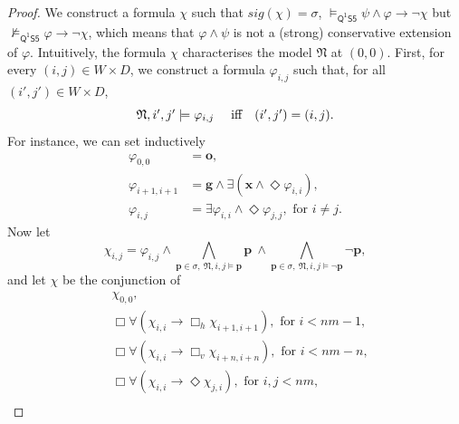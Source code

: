 \documentclass{lmcs} %
\theoremstyle{plain}\newtheorem{satz}[thm]{Satz} %
\newcommand{\sig}{\mathit{sig}}
\newcommand{\Bht}[1]{\Box_h{#1}}
\newcommand{\Bvt}[1]{\Box_v{#1}}
\newcommand{\FOMS}{\ensuremath{\mathsf{Q^1S5}}}
\newcommand{\fform}[1]{\boldsymbol{#1}}
\newcommand{\pvar}{\fform{p}}
\newcommand{\gvar}{\fform{g}}
\newcommand{\xvar}{\fform{x}}
\newcommand{\ovar}{\fform{o}}
\newcommand{\Bv}{\forall}
\newcommand{\Bh}{\Box}
\newcommand{\Dv}{\exists}
\newcommand{\Dh}{\Diamond}
\begin{document}
\begin{proof}
	
	
	We construct a formula $\chi$ such that $\sig(\chi) =\sigma$, $\models_\FOMS \psi\land \varphi \to \neg\chi$ but 
	$\not\models_\FOMS\varphi\to \neg\chi$, which means 
	that $\varphi \wedge \psi$ is not a (strong) conservative extension of $\varphi$. Intuitively, the formula $\chi$ characterises the model $\mathfrak{N}$ at $(0,0)$. 
	First, for every $(i,j)\in W\times D$, we construct a formula $\varphi_{i,j}$ such that, for all $(i',j')\in W\times D$,
	\begin{equation}
		\label{Mdesc}
		\mbox{$\mathfrak N,i',j'\models \varphi_{i,j}$ \quad iff} \quad  
		\mbox{$(i',j')=(i,j)$}.
	\end{equation}
	For instance, we can set inductively
	\begin{align*}
		\varphi_{0,0} & =\ovar, \\
		\varphi_{i+1,i+1}  & = \gvar \wedge \Dv (\xvar \wedge \Dh \varphi_{i,i}),\\
		\varphi_{i,j} & = \mbox{$\Dv \varphi_{i,i} \wedge \Dh \varphi_{j,j},\mbox{ for $i\not=j$.} $}
	\end{align*}
	Now let
	\begin{equation}\label{diagf}
		\chi_{i,j} = \varphi_{i,j} \wedge \bigwedge_{\pvar\in\sigma,\ \mathfrak N,i,j\models \pvar}\pvar\  \land
		\bigwedge_{\pvar\in\sigma,\ \mathfrak N,i,j\models \neg\pvar}\neg\pvar,
	\end{equation}
	and let $\chi$ be the conjunction of
	\begin{align}
		\label{origf}
		&\chi_{0,0}, \\
		\label{infiRh}
		&\Bh\Bv(\chi_{i,i} \rightarrow \Bht{\chi_{i+1,i+1}}), \text{ for $i<nm-1$}, \\
		\label{infiRv}
		&\Bh\Bv(\chi_{i,i} \rightarrow \Bvt{\chi_{i+n,i+n}}), \text{ for $i<nm-n$},\\
		\label{right}
		&\Bh\Bv(\chi_{i,i} \rightarrow \Dh \chi_{j,i}), \text{ for $i,j<nm$},\\
		\label{up}

\end{align}
\end{proof}
\end{document}
